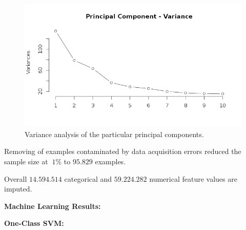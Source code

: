 \begin{figure}[h!]
    \centering
    \includegraphics[scale=0.50]{Graphics/PR-Analysis.png}
    \caption{Variance analysis of the particular principal components.}
    \label{fig:pca-var}
\end{figure}

Removing of examples contaminated by data acquisition errors reduced the sample size at \(~1\%\) to \(95.829\) examples.

Overall \(14.594.514\) categorical and \(59.224.282\) numerical feature values are imputed.


\textbf{Machine Learning Results:}

\textbf{One-Class SVM:}









